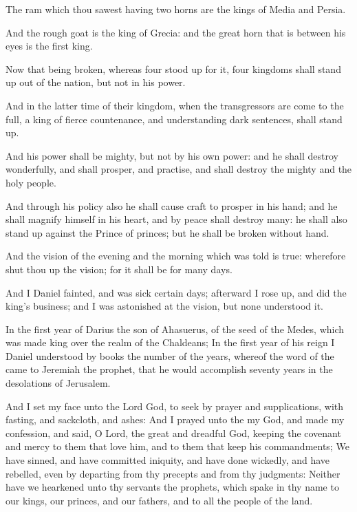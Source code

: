 \Verse The ram which thou sawest having two horns are the kings of Media and Persia.

\Verse And the rough goat is the king of Grecia: and the great horn that is between his eyes is the first king.

\Verse Now that being broken, whereas four stood up for it, four kingdoms shall stand up out of the nation, but not in his power.

\Verse And in the latter time of their kingdom, when the transgressors are come to the full, a king of fierce countenance, and understanding dark sentences, shall stand up.

\Verse And his power shall be mighty, but not by his own power: and he shall destroy wonderfully, and shall prosper, and practise, and shall destroy the mighty and the holy people.

\Verse And through his policy also he shall cause craft to prosper in his hand; and he shall magnify himself in his heart, and by peace shall destroy many: he shall also stand up against the Prince of princes; but he shall be broken without hand.

\Verse And the vision of the evening and the morning which was told is true: wherefore shut thou up the vision; for it shall be for many days.

\Verse And I Daniel fainted, and was sick certain days; afterward I rose up, and did the king's business; and I was astonished at the vision, but none understood it.


\Chapter
\Verse In the first year of Darius the son of Ahasuerus, of the seed of the Medes, which was made king over the realm of the Chaldeans; \Verse In the first year of his reign I Daniel understood by books the number of the years, whereof the word of the \LORD came to Jeremiah the prophet, that he would accomplish seventy years in the desolations of Jerusalem.

\Verse And I set my face unto the Lord God, to seek by prayer and supplications, with fasting, and sackcloth, and ashes: \Verse And I prayed unto the \LORD my God, and made my confession, and said, O Lord, the great and dreadful God, keeping the covenant and mercy to them that love him, and to them that keep his commandments; \Verse We have sinned, and have committed iniquity, and have done wickedly, and have rebelled, even by departing from thy precepts and from thy judgments: \Verse Neither have we hearkened unto thy servants the prophets, which spake in thy name to our kings, our princes, and our fathers, and to all the people of the land.

